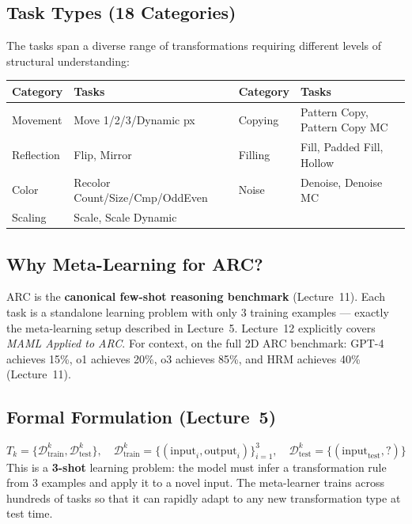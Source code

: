 \documentclass[11pt,a4paper]{article}
\begin{document}
\subsection{Task Types (18 Categories)}
The tasks span a diverse range of transformations requiring different levels of structural understanding:
\begin{center}\small
\begin{tabular}{llll}
\toprule
\textbf{Category} & \textbf{Tasks} & \textbf{Category} & \textbf{Tasks} \\
\midrule
Movement & Move 1/2/3/Dynamic px & Copying & Pattern Copy, Pattern Copy MC \\
Reflection & Flip, Mirror & Filling & Fill, Padded Fill, Hollow \\
Color & Recolor Count/Size/Cmp/OddEven & Noise & Denoise, Denoise MC \\
Scaling & Scale, Scale Dynamic & & \\
\bottomrule
\end{tabular}
\end{center}

\subsection{Why Meta-Learning for ARC?}
ARC is the \textbf{canonical few-shot reasoning benchmark} (Lecture~11). Each task is a standalone learning problem with only 3 training examples --- exactly the meta-learning setup described in Lecture~5. Lecture~12 explicitly covers \emph{MAML Applied to ARC}. For context, on the full 2D ARC benchmark: GPT-4 achieves 15\%, o1 achieves 20\%, o3 achieves 85\%, and HRM achieves 40\% (Lecture~11).

\subsection{Formal Formulation (Lecture~5)}
\begin{equation}
  T_k = \bigl\{\mathcal{D}_{\text{train}}^k, \mathcal{D}_{\text{test}}^k\bigr\}, \quad \mathcal{D}_{\text{train}}^k = \bigl\{(\text{input}_i, \text{output}_i)\bigr\}_{i=1}^3, \quad \mathcal{D}_{\text{test}}^k = \bigl\{(\text{input}_{\text{test}}, ?)\bigr\}
\end{equation}
This is a \textbf{3-shot} learning problem: the model must infer a transformation rule from 3 examples and apply it to a novel input. The meta-learner trains across hundreds of tasks so that it can rapidly adapt to any new transformation type at test time.
\end{document}
